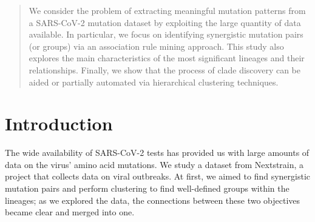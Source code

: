 \documentclass[a0,landscape]{a0poster}
\begin{document}
	\begin{multicols}{4} %
		
		
		\color{black} %
		
		\begin{abstract}
			
			\noindent We consider the problem of extracting meaningful mutation patterns from a SARS-CoV-2 mutation dataset by exploiting the large quantity of data available. In particular, we focus on identifying synergistic mutation pairs (or groups) via an association rule mining approach. This study also explores the main characteristics of the most significant lineages and their relationships. Finally, we show that the process of clade discovery can be aided or partially automated via hierarchical clustering techniques. 
		\end{abstract}
		
		
		\color{Black} %
		
		\section*{Introduction}
		
		The wide availability of SARS-CoV-2 tests has provided us with large amounts of data on the virus' amino acid mutations. We study a dataset from Nextstrain, a project that collects data on viral outbreaks. At first, we aimed to find synergistic mutation pairs and perform clustering to find well-defined groups within the lineages; as we explored the data, the connections between these two objectives became clear and merged into one.
		
		\color{Black}

\end{multicols}
\end{document}
